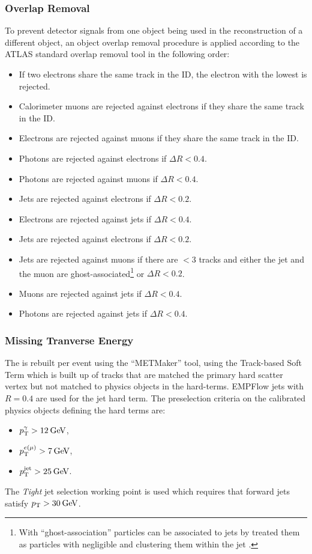 \subsubsection{Overlap Removal}

To prevent detector signals from one object being used in the reconstruction of a different object, an object overlap removal procedure is applied according to the ATLAS standard overlap removal tool \cite{ORTool} in the following order:
\begin{itemize}
    \item If two electrons share the same track in the ID, the electron with the lowest \pt is rejected.
    \item Calorimeter muons are rejected against electrons if they share the same track in the ID.
    \item Electrons are rejected against muons if they share the same track in the ID.
    \item Photons are rejected against electrons if $\Delta R<0.4$.
    \item Photons are rejected against muons if $\Delta R<0.4$.
    \item Jets are rejected against electrons if $\Delta R<0.2$.
    \item Electrons are rejected against jets if $\Delta R<0.4$.
    \item Jets are rejected against electrons if $\Delta R<0.2$.
    \item Jets are rejected against muons if there are $<3$ tracks and either the jet and the muon are ghost-associated\footnote{With ``ghost-association'' particles can be associated to jets by treated them as particles with negligible \pt and clustering them within the jet \cite{Insitu:ghostassociation}.} or $\Delta R<0.2$. 
    \item Muons are rejected against jets if $\Delta R<0.4$.
    \item Photons are rejected against jets if $\Delta R<0.4$.
\end{itemize}

\subsubsection{Missing Tranverse Energy}

The \met is rebuilt per event using the ``METMaker'' tool, using the Track-based Soft Term which is built up of tracks that are matched the primary hard scatter vertex but not matched to physics objects in the hard-terms. EMPFlow jets with $R=0.4$ are used for the jet hard term. The preselection criteria on the calibrated physics objects defining the \met hard terms are:
\begin{itemize}
  \item $p_{\text{T}}^{\gamma}>12\hspace{2pt}\text{Ge\kern -0.1em V}$,
  \item $p_{\text{T}}^{e(\mu)}>7\hspace{2pt}\text{Ge\kern -0.1em V}$,
  \item $p_{\text{T}}^{\text{jet}}>25\hspace{2pt}\text{Ge\kern -0.1em V}$.
\end{itemize}
The \textit{Tight} jet selection working point is used which requires that forward jets satisfy $p_{\text{T}}>30\hspace{2pt}\text{Ge\kern -0.1em V}$. 

